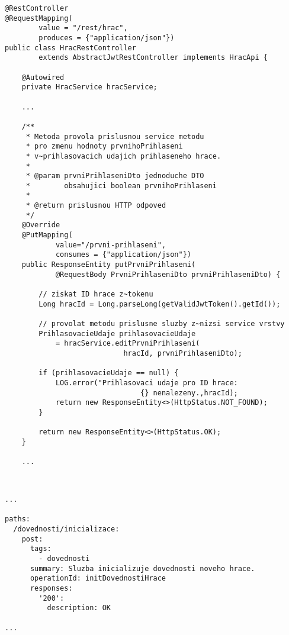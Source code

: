 \documentclass[12pt]{article}
\begin{document}

\begin{lstlisting}
@RestController
@RequestMapping(
        value = "/rest/hrac",
        produces = {"application/json"})
public class HracRestController 
        extends AbstractJwtRestController implements HracApi {
    
    @Autowired
    private HracService hracService;
    
    ...
    
    /**
     * Metoda provola prislusnou service metodu
     * pro zmenu hodnoty prvnihoPrihlaseni
     * v~prihlasovacich udajich prihlaseneho hrace.
     *
     * @param prvniPrihlaseniDto jednoduche DTO 
     *        obsahujici boolean prvnihoPrihlaseni
     *                           
     * @return prislusnou HTTP odpoved
     */
    @Override
    @PutMapping(
            value="/prvni-prihlaseni",
            consumes = {"application/json"})
    public ResponseEntity putPrvniPrihlaseni(
            @RequestBody PrvniPrihlaseniDto prvniPrihlaseniDto) {

        // ziskat ID hrace z~tokenu
        Long hracId = Long.parseLong(getValidJwtToken().getId());

        // provolat metodu prislusne sluzby z~nizsi service vrstvy
        PrihlasovacieUdaje prihlasovacieUdaje
            = hracService.editPrvniPrihlaseni(
                            hracId, prvniPrihlaseniDto);

        if (prihlasovacieUdaje == null) {
            LOG.error("Prihlasovaci udaje pro ID hrace:
                                {} nenalezeny.,hracId);
            return new ResponseEntity<>(HttpStatus.NOT_FOUND);
        }

        return new ResponseEntity<>(HttpStatus.OK);
    }
    
    ...
    
\end{lstlisting}



\begin{lstlisting}

...

paths:
  /dovednosti/inicializace:
    post:
      tags:
        - dovednosti
      summary: Sluzba inicializuje dovednosti noveho hrace.
      operationId: initDovednostiHrace
      responses:
        '200':
          description: OK

...

\end{lstlisting}
\end{document}
